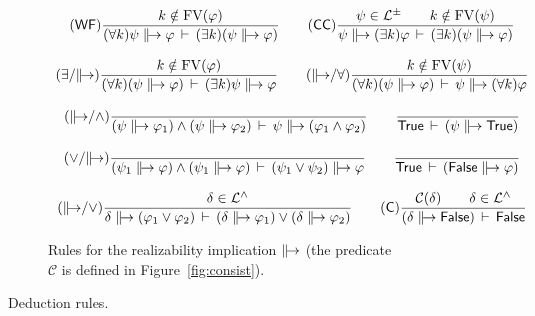\documentclass[%
  a4paper,
  UKenglish,
  cleveref,
  autoref,
  thm-restate,
  numberwithinsect,
]{lipics-v2021}
\newcommand\thesis{\vdash}
\newcommand\ax[1]{(\mathsf{#1})}
\newcommand\C{\mathcal{C}}		%
\newcommand\temp[1]{\mathsf{#1}}
\newcommand\True{\temp{True}}
\newcommand\False{\temp{False}}
\newcommand\FV{\mathrm{FV}}
\newcommand\defrealto{\mathrel\parallel\joinrel\to}
\newcommand\realto{\mathrel{\defrealto}}
\newcommand\itvar{k}
\newcommand\Lang{\mathcal{L}}
\begin{document}
\begin{figure}[p!]
\begin{subfigure}{\textwidth}
\centering
\(
\begin{array}{c}
%
\ax{WF}
\dfrac{\itvar \notin \FV(\varphi)}
  {(\forall \itvar)\psi \realto \varphi
  \,\thesis\,
  (\exists \itvar)(\psi \realto \varphi)}
%
\qquad
%
\ax{CC}
\dfrac{\psi \in \Lang^\pm
  \qquad
  \itvar \notin \FV(\psi)}
  {\psi \realto (\exists \itvar)\varphi
  \,\thesis\,
  (\exists \itvar)(\psi \realto \varphi)}
%
\\\\
%
\ax{\exists/{\realto}}
\dfrac{\itvar \notin \FV(\varphi)}
  {(\forall \itvar)(\psi \realto \varphi)
  \,\thesis\,
  (\exists \itvar)\psi \realto \varphi}
%
\qquad
%
\ax{{\realto}/\forall}
\dfrac{\itvar \notin \FV(\psi)}
  {(\forall \itvar)(\psi \realto \varphi)
  \,\thesis\,
  \psi \realto (\forall \itvar)\varphi}
%
\\\\
%
\ax{{\realto}/\land}
\dfrac{}
  {(\psi \realto \varphi_1) \land (\psi \realto \varphi_2)
  \,\thesis\,
  \psi \realto (\varphi_1 \land \varphi_2)}
%
\qquad
%
\dfrac{}
  {\True \,\thesis\, (\psi \realto \True)}
%
\\\\
%
\ax{\lor/{\realto}}
\dfrac{}
  {(\psi_1 \realto \varphi) \land (\psi_1 \realto \varphi)
  \,\thesis\,
  (\psi_1 \lor \psi_2) \realto \varphi}
%
\qquad
%
\dfrac{}
  {\True \,\thesis\, (\False \realto \varphi)}
%
\\\\
%
\ax{{\realto}/\lor}
\dfrac{\delta \in \Lang^\land}
  {\delta \realto (\varphi_1 \lor \varphi_2)
  \,\thesis\,
  (\delta \realto \varphi_1) \lor (\delta \realto \varphi_2)}
%
\qquad
%
\ax{C}
\dfrac{\C(\delta)
  \qquad
  \delta \in \Lang^\land}
  {(\delta \realto \False) \,\thesis\, \False}
%
\end{array}
\)
\caption{Rules for the realizability implication $\realto$
(the predicate $\C$ is defined in Figure~\ref{fig:consist}).%
\label{fig:ded:realto}}
\end{subfigure}

\caption{Deduction rules.%
\label{fig:ded}}
\end{figure}
\end{document}

